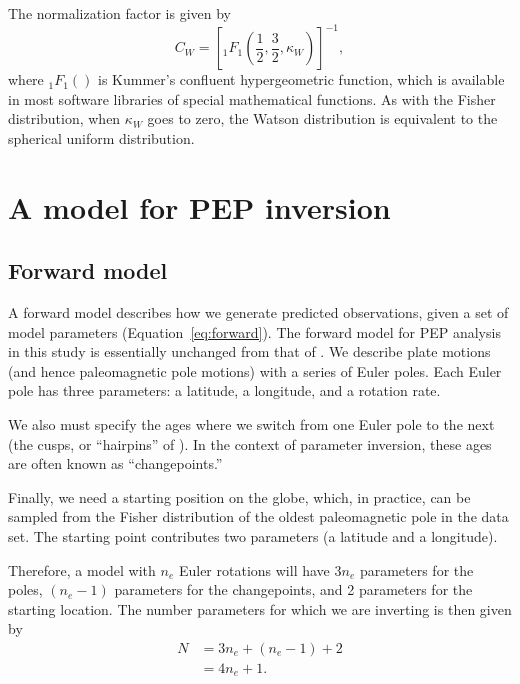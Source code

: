 \documentclass[11pt,letterpaper]{article}
\begin{document}
The normalization factor is given by
\begin{equation}
  C_W = \left[ {}_1 F_1 \left( \frac{1}{2}, \frac{3}{2}, \kappa_W \right) \right]^{-1},
\end{equation}
where ${}_1 F_1()$ is Kummer's confluent hypergeometric function, which is available in most software libraries of special mathematical functions. As with the Fisher distribution, when $\kappa_W$ goes to zero,  the Watson distribution is equivalent to the spherical uniform distribution.

\section*{A model for PEP inversion}
\label{sec:model}
\subsection*{Forward model}
\label{sec:forward_model}
A forward model describes how we generate predicted observations, given a set of model parameters (Equation~\eqref{eq:forward}). The forward model for PEP analysis in this study is essentially unchanged from that of \citet{Gordon1984a}. We describe plate motions (and hence paleomagnetic pole motions) with a series of Euler poles. Each Euler pole has three parameters: a latitude, a longitude, and a rotation rate.

We also must specify the ages where we switch from one Euler pole to the next (the cusps, or ``hairpins'' of \citet{Irving1972a}). In the context of parameter inversion, these ages are often known as ``changepoints.''

Finally, we need a starting position on the globe, which, in practice, can be sampled from the Fisher distribution of the oldest paleomagnetic pole in the data set. The starting point contributes two parameters (a latitude and a longitude).

Therefore, a model with $n_e$ Euler rotations will have $3 n_e$ parameters for the poles, $(n_e-1)$ parameters for the changepoints, and 2 parameters for the starting location. The number parameters for which we are inverting is then given by
\begin{equation}
\begin{aligned}
N &= 3 n_e + (n_e -1) + 2 \\
 &= 4 n_e + 1.
\end{aligned}
\label{eq:n_parameters}
\end{equation}
\end{document}
